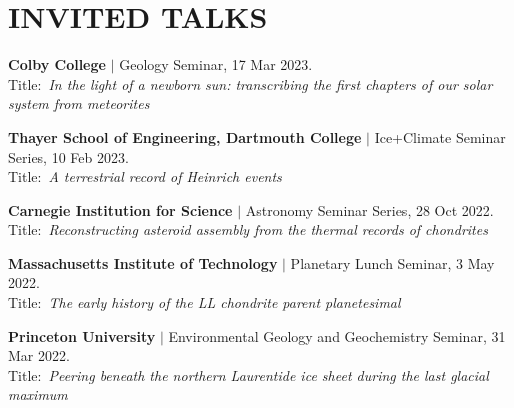 \section*{INVITED TALKS}

\begin{etaremune} [itemsep=4pt, leftmargin=3ex]
  \item \textbf{Colby College} $|$ Geology Seminar, 17 Mar 2023.\\
  Title:~\textit{In the light of a newborn sun: transcribing the first chapters of our solar system from meteorites}
  \item \textbf{Thayer School of Engineering, Dartmouth College} $|$ Ice+Climate Seminar Series, 10 Feb 2023. \\
  Title:~\textit{A terrestrial record of Heinrich events}
   \item \textbf{Carnegie Institution for Science} $|$
   Astronomy Seminar Series, 28 Oct 2022. \\
  Title:~\textit{Reconstructing asteroid assembly from the thermal records of chondrites}

   \item \textbf{Massachusetts Institute of Technology} $|$
   Planetary Lunch Seminar, 3 May 2022. \\
  Title:~\textit{The early history of the LL chondrite parent planetesimal}

  \item \textbf{Princeton University} $|$ 
  Environmental Geology and Geochemistry Seminar, 31 Mar 2022. \\
  Title:~\textit{Peering beneath the northern Laurentide ice sheet during the last glacial maximum}
  
\end{etaremune}